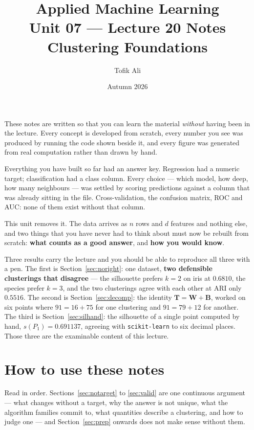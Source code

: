 \documentclass[11pt]{article}
\title{Applied Machine Learning\\Unit 07 --- Lecture 20 Notes\\
       Clustering Foundations}
\author{Tofik Ali}
\date{Autumn 2026}
\begin{document}
\maketitle

\begin{keyidea}
These notes are written so that you can learn the material \emph{without}
having been in the lecture. Every concept is developed from scratch, every
number you see was produced by running the code shown beside it, and every
figure was generated from real computation rather than drawn by hand.

Everything you have built so far had an answer key. Regression had a numeric
target; classification had a class column. Every choice --- which model, how
deep, how many neighbours --- was settled by scoring predictions against a
column that was already sitting in the file. Cross-validation, the confusion
matrix, ROC and AUC: none of them exist without that column.

This unit removes it. The data arrives as $n$ rows and $d$ features and
nothing else, and two things that you have never had to think about must now
be rebuilt from scratch: \textbf{what counts as a good answer}, and
\textbf{how you would know}.

Three results carry the lecture and you should be able to reproduce all three
with a pen. The first is Section~\ref{sec:noright}: one dataset,
\textbf{two defensible clusterings that disagree} --- the silhouette prefers
$k=2$ on iris at $0.6810$, the species prefer $k=3$, and the two clusterings
agree with each other at ARI only $0.5516$. The second is
Section~\ref{sec:decomp}: the identity
$\mathbf{T = W + B}$, worked on six points where $91 = 16 + 75$ for one
clustering and $91 = 79 + 12$ for another. The third is
Section~\ref{sec:silhand}: the silhouette of a single point computed by hand,
$s(P_1) = \mathbf{0.691137}$, agreeing with \texttt{scikit-learn} to six
decimal places. Those three are the examinable content of this lecture.
\end{keyidea}

\tableofcontents
\medskip

\section{How to use these notes}
\label{sec:how}

Read in order. Sections~\ref{sec:notarget} to \ref{sec:valid} are one
continuous argument --- what changes without a target, why the answer is not
unique, what the algorithm families commit to, what quantities describe a
clustering, and how to judge one --- and Section~\ref{sec:prep} onwards does
not make sense without them.
\end{document}
